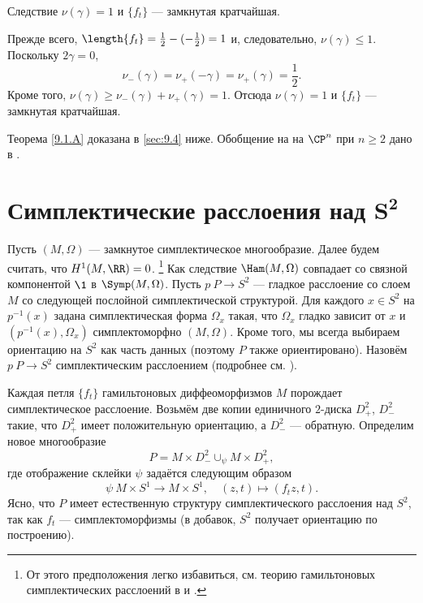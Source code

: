 \begin{thm}[(\cite{LM2})]{Следствие} $\nu(\gamma) = 1$ и $\{f_t\}$ ---
  замкнутая кратчайшая.
\end{thm}

Прежде всего, $\length\{f_t\} =\frac12 - (-\frac12 ) = 1$ и,
следовательно, $\nu(\gamma) \le 1$. 
Поскольку $2\gamma = 0$, 
\[\nu_- (\gamma) = \nu_+ (-\gamma) = \nu_+ (\gamma) =\frac12.\]
Кроме того, $\nu(\gamma) \ge \nu_- (\gamma) + \nu_+ (\gamma) = 1$.
Отсюда $\nu(\gamma) = 1$ и $\{f_t\}$ --- замкнутая кратчайшая.

Теорема \ref{9.1.A} доказана в \ref{sec:9.4} ниже.
Обобщение на на $\CP^n$ при $n \ge 2$ дано в \cite{P3}.

\section[\texorpdfstring{Симплектические расслоения над $S^2$}{Симплектические расслоения над S²}]{Симплектические расслоения над $\bm{S^2}$}
\label{sec:9.2}

Пусть $(M, \Omega)$ --- замкнутое симплектическое многообразие.
Далее будем считать, что $H^1 (M, \RR) = 0$.%
\footnote{От этого предположения легко избавиться, см. теорию
  гамильтоновых симплектических расслоений в \cite{MS} и \cite{P4}.} 
Как следствие $\Ham(M, \Omega)$ совпадает со связной компонентой $\1$
в $\Symp(M, \Omega)$. 
Пусть $p \: P \to S^2$ --- гладкое расслоение со слоем $M$ со
следующей послойной симплектической структурой.
Для каждого $x \in S^2$ на $p^{-1} (x)$ задана симплектическая форма
$\Omega_x$ такая, что $\Omega_x$ гладко зависит от $x$ и $(p^{-1} (x),
\Omega_x)$  симплектоморфно $(M, \Omega)$.
Кроме того, мы всегда выбираем ориентацию на $S^2$ как часть данных
(поэтому $P$ также ориентировано).
Назовём $p\: P\to S^2$ симплектическим расслоением (подробнее
см. \cite{MS}). 

Каждая петля $\{f_t\}$ гамильтоновых диффеоморфизмов $M$ порождает
симплектическое расслоение.
Возьмём две копии единичного $2$-диска $D_+^2$, $D_-^2$ такие, что
$D_+^2$ имеет положительную ориентацию, а $D_-^2$ --- обратную.
Определим новое многообразие
\[P =  M  \times D_-^2 \cup_\psi M \times D_+^2,\]
где отображение склейки $\psi$ задаётся следующим образом
\[\psi \: M \times S^1 \to M \times S^1,\quad (z, t) \mapsto (f_t z, t).\]
Ясно, что $P$ имеет естественную структуру симплектического расслоения
над $S^2$, так как $f_t$ --- симплектоморфизмы (в добавок, $S^2$
получает ориентацию по построению).

